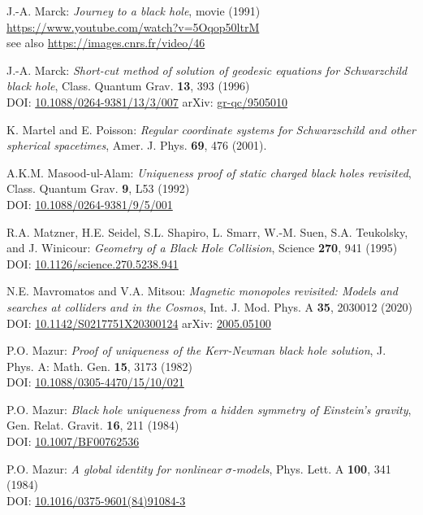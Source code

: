 \begin{thebibliography}{123}
J.-A. Marck:
{\em Journey to a black hole}, movie (1991)\\
\url{https://www.youtube.com/watch?v=5Oqop50ltrM}\\
see also \url{https://images.cnrs.fr/video/46}

J.-A. Marck:
{\em Short-cut method of solution of geodesic equations for Schwarzchild black hole},
Class. Quantum Grav. {\bf 13}, 393 (1996)\\
DOI: \href{https://doi.org/10.1088/0264-9381/13/3/007}{10.1088/0264-9381/13/3/007}\hfill
arXiv: \href{https://arxiv.org/abs/gr-qc/9505010}{gr-qc/9505010}

K. Martel and E. Poisson:
{\em Regular coordinate systems for Schwarzschild and other spherical spacetimes},
Amer. J. Phys. {\bf 69}, 476 (2001).

A.K.M. Masood-ul-Alam:
{\em Uniqueness proof of static charged black holes revisited},
Class. Quantum Grav. {\bf 9}, L53 (1992)\\
DOI: \href{https://doi.org/10.1088/0264-9381/9/5/001}{10.1088/0264-9381/9/5/001}

R.A. Matzner, H.E. Seidel, S.L. Shapiro, L. Smarr, W.-M. Suen, S.A. Teukolsky, and
J. Winicour: {\em Geometry of a Black Hole Collision},
Science {\bf 270}, 941 (1995)\\
DOI: \href{https://doi.org/10.1126/science.270.5238.941}{10.1126/science.270.5238.941}

N.E. Mavromatos and V.A. Mitsou:
{\em Magnetic monopoles revisited: Models and searches at colliders and in the Cosmos},
Int. J. Mod. Phys. A {\bf 35}, 2030012 (2020)\\
DOI: \href{https://doi.org/10.1142/S0217751X20300124}{10.1142/S0217751X20300124}\hfill
arXiv: \href{https://arxiv.org/abs/2005.05100}{2005.05100}

P.O. Mazur:
{\em Proof of uniqueness of the Kerr-Newman black hole solution},
J. Phys. A: Math. Gen. {\bf 15}, 3173 (1982)\\
DOI: \href{https://doi.org/10.1088/0305-4470/15/10/021}{10.1088/0305-4470/15/10/021}

P.O. Mazur:
{\em Black hole uniqueness from a hidden symmetry of Einstein's gravity},
Gen. Relat. Gravit. {\bf 16}, 211 (1984)\\
DOI: \href{https://doi.org/10.1007/BF00762536}{10.1007/BF00762536}

P.O. Mazur:
{\em A global identity for nonlinear $\sigma$-models},
Phys. Lett. A {\bf 100}, 341 (1984)\\
DOI: \href{https://doi.org/10.1016/0375-9601(84)91084-3}{10.1016/0375-9601(84)91084-3}


\end{thebibliography}
